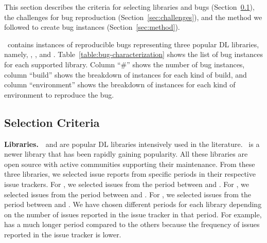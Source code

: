 \documentclass[sigconf,screen]{acmart}
\begin{document}
This section describes the criteria for selecting libraries and bugs
(Section~\ref{sec:selection-criterion}), the challenges for bug
reproduction (Section~\ref{sec:challenges}), and the method we
followed to create bug instances (Section~\ref{sec:method}).

\tname\ contains \numbugs{} instances of reproducible bugs
representing three popular DL libraries, namely, \jax, \tf, and
\torch. Table~\ref{table:bug-characterization} shows the list of bug
instances for each supported library. Column ``\#'' shows the number
of bug instances, column ``build'' shows the breakdown of instances
for each kind of build, and column ``environment'' shows the breakdown
of instances for each kind of environment to reproduce the bug.

\subsection{Selection Criteria}
\label{sec:selection-criterion}


\textbf{Libraries.}~\torch~and \tf are popular DL libraries
intensively used in the literature. \jax\ is a newer library that has
been rapidly gaining popularity. All these libraries are open source
with active communities supporting their maintenance. From these three
libraries, we selected issue reports from specific periods in their
respective issue trackers. For \torch, we selected issues from the
period between \torchfrom and \torchto. For \tf, we selected issues
from the period between \tffrom and \tfto. For \jax, we selected
issues from the period between \jaxfrom and \jaxto. We have chosen
different periods for each library depending on the number of issues
reported in the issue tracker in that period. For example, \tf has a
much longer period compared to the others because the frequency of
issues reported in the issue tracker is lower.



\end{document}
